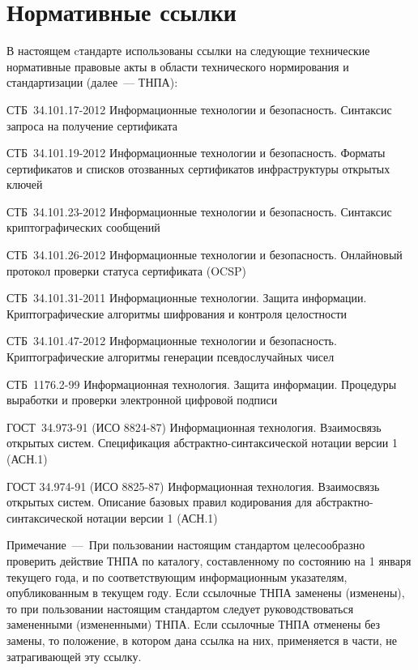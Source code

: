 \chapter{Нормативные ссылки}

В настоящем cтандарте использованы ссылки на следующие 
технические нормативные правовые акты в области 
технического нормирования и стандартизации (далее~--- ТНПА):

СТБ~34.101.17-2012 Информационные технологии и безопасность.
Синтаксис запроса на получение сертификата

СТБ~34.101.19-2012 Информационные технологии и безопасность. 
Форматы сертификатов и списков отозванных сертификатов 
инфраструктуры открытых ключей

СТБ~34.101.23-2012 Информационные технологии и безопасность. 
Синтаксис криптографических сообщений 

СТБ~34.101.26-2012 Информационные технологии и безопасность. 
Онлайновый протокол проверки статуса сертификата (OCSP)

СТБ~34.101.31-2011 Информационные технологии. Защита информации.
Криптографические алгоритмы шифрования и контроля целостности

СТБ~34.101.47-2012 Информационные технологии и безопасность. 
Криптографические алгоритмы генерации псевдослучайных чисел

СТБ~1176.2-99 Информационная технология. Защита информации. 
Процедуры выработки и проверки электронной цифровой подписи

ГОСТ~34.973-91 (ИСО 8824-87) Информационная технология. Взаимосвязь
открытых систем. Спецификация абстрактно-синтаксической нотации
версии 1 (АСН.1)

ГОСТ 34.974-91 (ИСО 8825-87) Информационная технология. Взаимосвязь
открытых систем. Описание базовых правил кодирования для 
абстрактно-синтаксической нотации версии 1 (АСН.1)

\begin{note}
Примечание~---~При пользовании настоящим стандартом
целесообразно проверить действие ТНПА по каталогу, 
составленному по состоянию на 1 января текущего
года, и по соответствующим информационным указателям, опубликованным
в текущем году.
%
Если ссылочные ТНПА заменены (изменены), то при
пользовании настоящим стандартом следует руководствоваться
замененными (измененными) ТНПА. Если ссылочные ТНПА отменены без
замены, то положение, в котором дана ссылка на них, применяется в
части, не затрагивающей эту ссылку.
\end{note}

